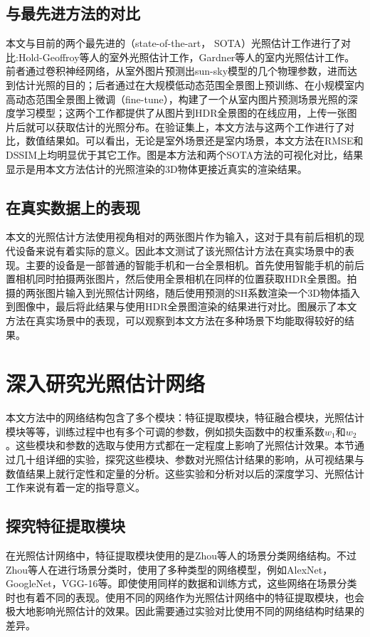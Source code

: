 \subsection{与最先进方法的对比}
本文与目前的两个最先进的（state-of-the-art， SOTA）光照估计工作进行了对比:Hold-Geoffroy等人\cite{hold2017deep}的室外光照估计工作，Gardner等人\cite{gardner2017learning}的室内光照估计工作。前者通过卷积神经网络，从室外图片预测出sun-sky模型\cite{hovsekhovsek2013adding}的几个物理参数，进而达到估计光照的目的；后者通过在大规模低动态范围全景图上预训练、在小规模室内高动态范围全景图上微调（fine-tune），构建了一个从室内图片预测场景光照的深度学习模型；这两个工作都提供了从图片到HDR全景图的在线应用，上传一张图片后就可以获取估计的光照分布。在验证集上，本文方法与这两个工作进行了对比，数值结果如。可以看出，无论是室外场景还是室内场景，本文方法在RMSE和DSSIM上均明显优于其它工作。图是本方法和两个SOTA方法的可视化对比，结果显示是用本文方法估计的光照渲染的3D物体更接近真实的渲染结果。
\subsection{在真实数据上的表现}
本文的光照估计方法使用视角相对的两张图片作为输入，这对于具有前后相机的现代设备来说有着实际的意义。因此本文测试了该光照估计方法在真实场景中的表现。主要的设备是一部普通的智能手机和一台全景相机。首先使用智能手机的前后置相机同时拍摄两张图片，然后使用全景相机在同样的位置获取HDR全景图。拍摄的两张图片输入到光照估计网络，随后使用预测的SH系数渲染一个3D物体插入到图像中，最后将此结果与使用HDR全景图渲染的结果进行对比。图展示了本文方法在真实场景中的表现，可以观察到本文方法在多种场景下均能取得较好的结果。
\section{深入研究光照估计网络}\label{sec:ablation-study}
本文方法中的网络结构包含了多个模块：特征提取模块，特征融合模块，光照估计模块等等，训练过程中也有多个可调的参数，例如损失函数中的权重系数$w_1$和$w_2$。这些模块和参数的选取与使用方式都在一定程度上影响了光照估计效果。本节通过几十组详细的实验，探究这些模块、参数对光照估计结果的影响，从可视结果与数值结果上就行定性和定量的分析。这些实验和分析对以后的深度学习、光照估计工作来说有着一定的指导意义。
\subsection{探究特征提取模块}
在光照估计网络中，特征提取模块使用的是Zhou等人\cite{zhou2017places}的场景分类网络结构。不过Zhou等人\cite{zhou2017places}在进行场景分类时，使用了多种类型的网络模型，例如AlexNet\cite{krizhevsky2012imagenet}，GoogleNet\cite{szegedy2015going}，VGG-16\cite{simonyan2014very}等。即使使用同样的数据和训练方式，这些网络在场景分类时也有着不同的表现。使用不同的网络作为光照估计网络中的特征提取模块，也会极大地影响光照估计的效果。因此需要通过实验对比使用不同的网络结构时结果的差异。


